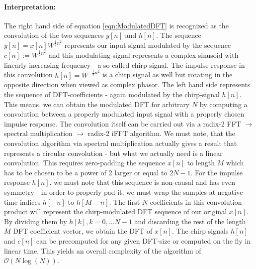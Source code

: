 \paragraph{Interpretation:}
The right hand side of equation \ref{eqn:ModulatedDFT} is recognized as the convolution of the two sequences $y[n]$ and $h[n]$. The sequence $y[n] = x[n] W^{\frac{1}{2}n^2}$ represents our input signal modulated by the sequence $c[n] := W^{\frac{1}{2}n^2}$ and this modulating signal represents a complex sinusoid with linearly increasing frequency - a so called chirp signal. The impulse response in this convolution $h[n] = W^{-\frac{1}{2} n^2}$ is a chirp signal as well but rotating in the opposite direction when viewed as complex phasor. The left hand side represents the sequence of DFT-coefficients - again modulated by the chirp-signal $h[n]$. This means, we can obtain the modulated DFT for arbitrary $N$ by computing a convolution between a properly modulated input signal with a properly chosen impulse response. The convolution itself can be carried out via a radix-2 FFT $\rightarrow$ spectral multiplication  $\rightarrow$ radix-2 iFFT algorithm. We must note, that the convolution algorithm via spectral multiplication actually gives a result that represents a circular convolution - but what we actually need is a linear convolution. This requires zero-padding the sequence $x[n]$  to length $M$ which has to be chosen to be a power of 2 larger or equal to $2N-1$. For the impulse response $h[n]$, we must note that this sequence is non-causal and has even symmetry - in order to properly pad it, we must wrap the samples at negative time-indices $h[-n]$ to $h[M-n]$. The first $N$ coefficients in this convolution product will represent the chirp-modulated DFT sequence of our original $x[n]$. By dividing them by $h[k], k=0, \ldots N-1$ and discarding the rest of the length $M$ DFT coefficient vector, we obtain the DFT of $x[n]$. The chirp signals $h[n]$ and $c[n]$ can be precomputed for any given DFT-size or computed on the fly in linear time. This yields an overall complexity of the algorithm of $\mathcal{O}(N \log(N))$. 

